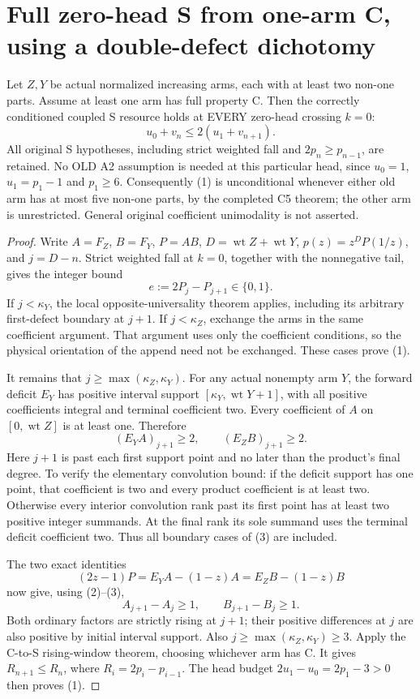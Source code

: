 \section{Full zero-head S from one-arm C, using a double-defect dichotomy}
\begin{theorem}
Let $Z,Y$ be actual normalized increasing arms, each with at least two
non-one parts. Assume at least one arm has full property C. Then the
correctly conditioned coupled S resource holds at EVERY zero-head
crossing $k=0$:
\[
                  u_0+v_n\le2(u_1+v_{n+1}).              \tag{1}
\]
All original S hypotheses, including strict weighted fall and
$2p_n\ge p_{n-1}$, are retained. No OLD A2 assumption is needed
at this particular head, since $u_0=1$, $u_1=p_1-1$ and $p_1\ge6$.
Consequently (1) is unconditional whenever either old arm has at most
five non-one parts, by the completed C5 theorem; the other arm is
unrestricted. General original coefficient unimodality is not asserted.
\end{theorem}
\begin{proof}
Write $A=F_Z$, $B=F_Y$, $P=AB$, $D=\operatorname{wt}Z+
\operatorname{wt}Y$, $p(z)=z^DP(1/z)$, and $j=D-n$.
Strict weighted fall at $k=0$, together with the nonnegative tail,
gives the integer bound
\[
                    e:=2P_j-P_{j+1}\in\{0,1\}.          \tag{2}
\]
If $j<\kappa_Y$, the local opposite-universality theorem applies,
including its arbitrary first-defect boundary at $j+1$. If
$j<\kappa_Z$, exchange the arms in the same coefficient argument.
That argument uses only the coefficient conditions, so the physical
orientation of the append need not be exchanged. These cases prove (1).

It remains that $j\ge\max(\kappa_Z,\kappa_Y)$.
For any actual nonempty arm $Y$, the forward deficit $E_Y$ has positive
interval support $[\kappa_Y,\operatorname{wt}Y+1]$, with all positive
coefficients integral and terminal coefficient two. Every coefficient
of $A$ on $[0,\operatorname{wt}Z]$ is at least one. Therefore
\[
          (E_YA)_{j+1}\ge2,\qquad(E_ZB)_{j+1}\ge2.       \tag{3}
\]
Here $j+1$ is past each first support point and no later than the
product's final degree. To verify the elementary convolution bound:
if the deficit support has one point, that coefficient is two and
every product coefficient is at least two. Otherwise every interior
convolution rank past its first point has at least two positive
integer summands. At the final rank its sole summand uses the terminal
deficit coefficient two. Thus all boundary cases of (3) are included.

The two exact identities
\[
 (2z-1)P=E_YA-(1-z)A=E_ZB-(1-z)B
\]
now give, using (2)--(3),
\[
                 A_{j+1}-A_j\ge1,\qquad B_{j+1}-B_j\ge1. \tag{4}
\]
Both ordinary factors are strictly rising at $j+1$; their positive
differences at $j$ are also positive by initial interval support.
Also $j\ge\max(\kappa_Z,\kappa_Y)\ge3$.
Apply the C-to-S rising-window theorem, choosing whichever arm has C.
It gives $R_{n+1}\le R_n$, where $R_i=2p_i-p_{i-1}$.
The head budget $2u_1-u_0=2p_1-3>0$ then proves (1).
\end{proof}

